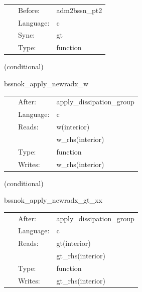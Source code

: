 \documentclass{article}
\begin{document}
\hspace{5mm}

 \begin{tabular*}{160mm}{cll} 
~ & Before:  & adm2bssn\_pt2 \\ 
~ & Language:  & c \\ 
~ & Sync:  & gt \\ 
~ & Type:  & function \\ 
\end{tabular*} 


\vspace{5mm}

   (conditional) 

\hspace{5mm} bssnok\_apply\_newradx\_w 



\hspace{5mm}

 \begin{tabular*}{160mm}{cll} 
~ & After:  & apply\_dissipation\_group \\ 
~ & Language:  & c \\ 
~ & Reads:  & w(interior) \\ 
~& ~ &w\_rhs(interior)\\ 
~ & Type:  & function \\ 
~ & Writes:  & w\_rhs(interior) \\ 
\end{tabular*} 


\vspace{5mm}

   (conditional) 

\hspace{5mm} bssnok\_apply\_newradx\_gt\_xx 



\hspace{5mm}

 \begin{tabular*}{160mm}{cll} 
~ & After:  & apply\_dissipation\_group \\ 
~ & Language:  & c \\ 
~ & Reads:  & gt(interior) \\ 
~& ~ &gt\_rhs(interior)\\ 
~ & Type:  & function \\ 
~ & Writes:  & gt\_rhs(interior) \\ 
\end{tabular*} 
\end{document}
